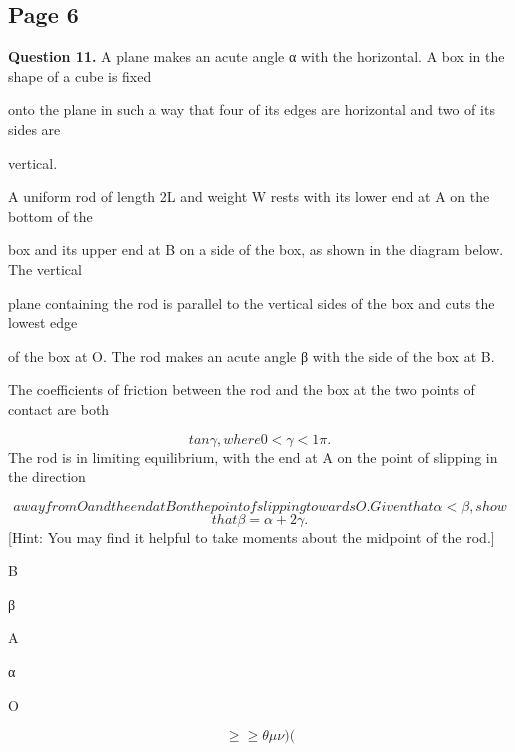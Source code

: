 \documentclass[12pt]{article}
\begin{document}
\subsection*{Page 6}
\begin{flushleft}
\bigskip\textbf{Question 11.} A plane makes an acute angle α with the horizontal. A box in the shape of a cube is fixed\par
onto the plane in such a way that four of its edges are horizontal and two of its sides are\par
vertical.\par
A uniform rod of length 2L and weight W rests with its lower end at A on the bottom of the\par
box and its upper end at B on a side of the box, as shown in the diagram below. The vertical\par
plane containing the rod is parallel to the vertical sides of the box and cuts the lowest edge\par
of the box at O. The rod makes an acute angle β with the side of the box at B.\par
The coefficients of friction between the rod and the box at the two points of contact are both\par
\[tan γ, where 0 < γ < 1 \pi.\]
The rod is in limiting equilibrium, with the end at A on the point of slipping in the direction\par
\[away from O and the end at B on the point of slipping towards O. Given that α < β, show\]
\[that β = α + 2γ.\]
[Hint: You may find it helpful to take moments about the midpoint of the rod.]\par
B\par
β\par
A\par
α\par
O\par
\[\geq\geq\theta\mu\nu) (\]
\end{flushleft}
\end{document}
